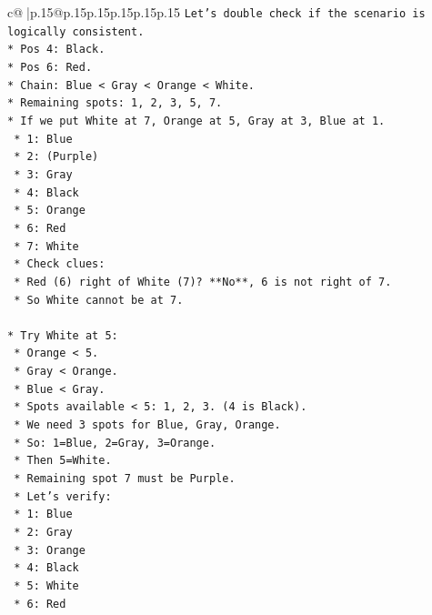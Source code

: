 \documentclass{article}
\begin{document}
{\begin{supertabular}{c@{$\;$}|p{.15\linewidth}@{}p{.15\linewidth}p{.15\linewidth}p{.15\linewidth}p{.15\linewidth}p{.15\linewidth}}
{{{\texttt{Let's double check if the scenario is logically consistent.} \\
\texttt{*   Pos 4: Black.} \\
\texttt{*   Pos 6: Red.} \\
\texttt{*   Chain: Blue < Gray < Orange < White.} \\
\texttt{*   Remaining spots: 1, 2, 3, 5, 7.} \\
\texttt{*   If we put White at 7, Orange at 5, Gray at 3, Blue at 1.} \\
\texttt{    *   1: Blue} \\
\texttt{    *   2: (Purple)} \\
\texttt{    *   3: Gray} \\
\texttt{    *   4: Black} \\
\texttt{    *   5: Orange} \\
\texttt{    *   6: Red} \\
\texttt{    *   7: White} \\
\texttt{    *   Check clues:} \\
\texttt{        *   Red (6) right of White (7)? **No**, 6 is not right of 7.} \\
\texttt{    *   So White cannot be at 7.} \\
\\ 
\texttt{*   Try White at 5:} \\
\texttt{    *   Orange < 5.} \\
\texttt{    *   Gray < Orange.} \\
\texttt{    *   Blue < Gray.} \\
\texttt{    *   Spots available < 5: 1, 2, 3. (4 is Black).} \\
\texttt{    *   We need 3 spots for Blue, Gray, Orange.} \\
\texttt{    *   So: 1=Blue, 2=Gray, 3=Orange.} \\
\texttt{    *   Then 5=White.} \\
\texttt{    *   Remaining spot 7 must be Purple.} \\
\texttt{    *   Let's verify:} \\
\texttt{        *   1: Blue} \\
\texttt{        *   2: Gray} \\
\texttt{        *   3: Orange} \\
\texttt{        *   4: Black} \\
\texttt{        *   5: White} \\
\texttt{        *   6: Red} \\
}}}
\end{supertabular}}
\end{document}
